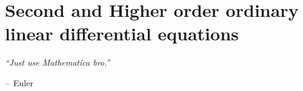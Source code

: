 \documentclass[oneside,11pt,pdftex,final]{book}%
\makeatletter
\numberwithin{equation}{section}
\newenvironment{chapquote}[2][2em]
{\setlength{\@tempdima}{#1}%
	\def\chapquote@author{#2}%
	\parshape 1 \@tempdima \dimexpr\textwidth-2\@tempdima\relax%
	\itshape}
{\par\normalfont\hfill--\ \chapquote@author\hspace*{\@tempdima}\par\bigskip}
\newtheorem{example}[theorem]{Example}
\numberwithin{section}{chapter}
\numberwithin{equation}{chapter}
\makeatother
\begin{document}

%	
%
%
\chapter{Second and Higher order ordinary linear differential equations}
\begin{chapquote}{Euler}
	``Just use Mathematica bro.''
\end{chapquote}
\end{document}
